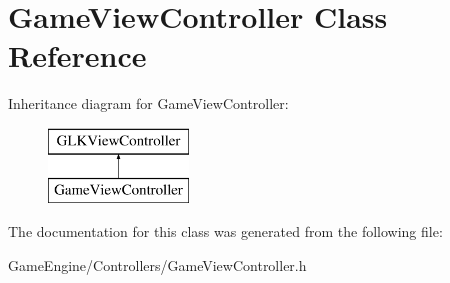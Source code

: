 \hypertarget{interface_game_view_controller}{}\section{Game\+View\+Controller Class Reference}
\label{interface_game_view_controller}
Inheritance diagram for Game\+View\+Controller\+:\begin{figure}[H]
\begin{center}
\leavevmode
\includegraphics[height=2.000000cm]{interface_game_view_controller}
\end{center}
\end{figure}


The documentation for this class was generated from the following file\+:\begin{DoxyCompactItemize}
\item 
Game\+Engine/\+Controllers/Game\+View\+Controller.\+h\end{DoxyCompactItemize}
